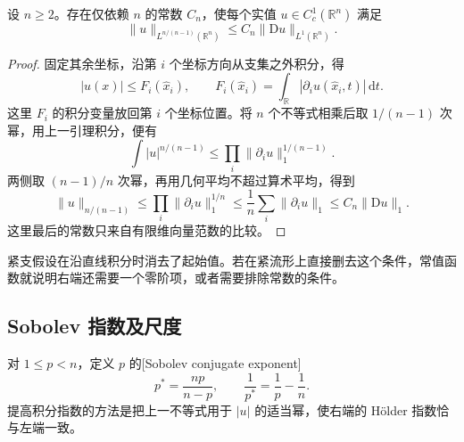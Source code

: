 \begin{proposition}\label{g3:prop:sobolev-one-gradient}
	设 \(n\ge2\)。存在仅依赖 \(n\) 的常数 \(C_n\)，使每个实值 \(u\in C_c^1(\mathbb R^n)\) 满足
	\begin{equation}\label{g3:eq:sobolev-one-gradient}
		\|u\|_{L^{n/(n-1)}(\mathbb R^n)}\le C_n\|\mathrm Du\|_{L^1(\mathbb R^n)}.
	\end{equation}
\end{proposition}
\begin{proof}
	固定其余坐标，沿第 \(i\) 个坐标方向从支集之外积分，得
	\[
		|u(x)|\le F_i(\widehat x_i),\qquad
		F_i(\widehat x_i)=\int_{\mathbb R}|\partial_i u(\widehat x_i,t)|\,\mathrm dt.
	\]
	这里 \(F_i\) 的积分变量放回第 \(i\) 个坐标位置。将 \(n\) 个不等式相乘后取 \(1/(n-1)\) 次幂，用上一引理积分，便有
	\[
		\int |u|^{n/(n-1)}\le\prod_i\|\partial_i u\|_1^{1/(n-1)}.
	\]
	两侧取 \((n-1)/n\) 次幂，再用几何平均不超过算术平均，得到
	\[
		\|u\|_{n/(n-1)}\le\prod_i\|\partial_i u\|_1^{1/n}
		\le\frac1n\sum_i\|\partial_i u\|_1\le C_n\|\mathrm Du\|_1.
	\]
	这里最后的常数只来自有限维向量范数的比较。
\end{proof}

紧支假设在沿直线积分时消去了起始值。若在紧流形上直接删去这个条件，常值函数就说明右端还需要一个零阶项，或者需要排除常数的条件。

\subsection{Sobolev 指数及尺度}
\label{g3:subsec:1103:02}
对 \(1\le p<n\)，定义 \(p\) 的[Sobolev conjugate exponent]
\begin{equation}\label{g3:eq:sobolev-conjugate}
	p^*=\frac{np}{n-p},\qquad \frac1{p^*}=\frac1p-\frac1n.
\end{equation}
提高积分指数的方法是把上一不等式用于 \(|u|\) 的适当幂，使右端的 Hölder 指数恰与左端一致。

